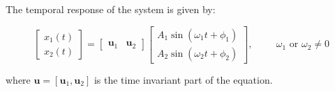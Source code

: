 \documentclass[12pt,letter]{article}
\begin{document}
\begin{example}
\pagebreak


The temporal response of the system is given by:

\begin{equation}
\begin{bmatrix} x_1(t) \\  x_2(t) \end{bmatrix} =  \begin{bmatrix} \mathbf{u}_1 & \mathbf{u}_2 \end{bmatrix}
\begin{bmatrix} A_1 \sin (\omega_1 t + \phi_1 )\\ A_2 \sin (\omega_2 t + \phi_2 )\end{bmatrix}, \hspace{1cm} \omega_1 \text{ or } \omega_2 \neq 0
\end{equation}

where $\mathbf{u} = [\mathbf{u}_1, \mathbf{u}_2]$ is the time invariant part of the equation. 


\end{example}
		

		
		
		
\end{document}
